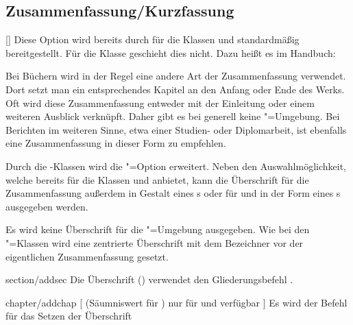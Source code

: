 \begin{Declaration*}{}
\begin{Declaration*}{}
\begin{Declaration*}{}
\subsection{Zusammenfassung/Kurzfassung}
%
%
\begin{Declaration}{[\PSet]}%
\printdeclarationlist%
%
%
Diese Option wird bereits durch \KOMAScript{} für die Klassen  
und  standardmäßig bereitgestellt. Für die Klasse 
 geschieht dies nicht. Dazu heißt es im Handbuch:
%
\begin{quoting}
Bei Büchern wird in der Regel eine andere Art der Zusammenfassung verwendet. 
Dort setzt man ein entsprechendes Kapitel an den Anfang oder Ende des Werks. 
Oft wird diese Zusammenfassung entweder mit der Einleitung oder einem weiteren 
Ausblick verknüpft. Daher gibt es bei  generell keine 
"=Umgebung. Bei Berichten im weiteren Sinne, etwa einer 
Studien- oder Diplomarbeit, ist ebenfalls eine Zusammenfassung in dieser Form 
zu empfehlen.
\end{quoting}
%
Durch die \TUDScript-Klassen wird die "=Option erweitert. 
Neben den Auswahlmöglichkeit, welche bereits \KOMAScript{} für die Klassen 
 und  anbietet, kann die Überschrift für 
die Zusammenfassung außerdem in Gestalt eines \sectionautorefname{}s oder für 
 und  in der Form eines 
\chapterautorefname{}s ausgegeben werden.
%
\begin{values}
  Es wird keine Überschrift für die "=Umgebung ausgegeben.
  Wie bei den \KOMAScript"=Klassen wird eine zentrierte Überschrift mit dem 
  Bezeichner  vor der eigentlichen Zusammenfassung gesetzt.
\item[section/addsec]
  Die Überschrift () verwendet den Gliederungsbefehl 
  .
\item[chapter/addchap][%
    (Säumniswert für \Class{tudscrbook})
    nur für \Class{tudscrreprt} und \Class{tudscrbook} verfügbar%
  ]
  Es wird der Befehl  für das Setzen der Überschrift 

\end{values}
\end{Declaration}
\end{Declaration*}
\end{Declaration*}
\end{Declaration*}
